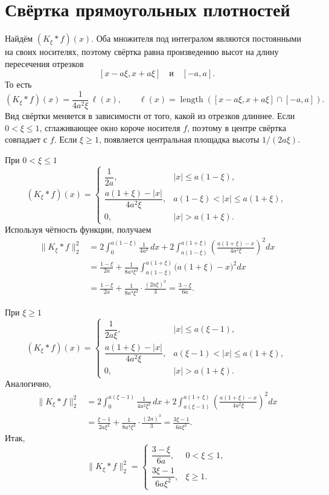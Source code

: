 \section*{Свёртка прямоугольных плотностей}

Найдём $(K_\xi*f)(x)$. Оба множителя под интегралом являются постоянными на
своих носителях, поэтому свёртка равна произведению высот на длину
пересечения отрезков
\[
[x-a\xi,x+a\xi]\quad\text{и}\quad[-a,a].
\]
То есть
\[
(K_\xi*f)(x)
=\frac{1}{4a^2\xi}\,\ell(x),
\qquad
\ell(x)=
\operatorname{length}\left([x-a\xi,x+a\xi]\cap[-a,a]\right).
\]
Вид свёртки меняется в зависимости от того, какой из отрезков длиннее.
Если $0<\xi\le 1$, сглаживающее окно короче носителя $f$, поэтому в центре
свёртка совпадает с $f$. Если $\xi\ge 1$, появляется центральная площадка
высоты $1/(2a\xi)$.

При $0<\xi\le 1$
\[
(K_\xi*f)(x)=
\begin{cases}
\dfrac{1}{2a}, & |x|\le a(1-\xi),\\[6pt]
\dfrac{a(1+\xi)-|x|}{4a^2\xi},
& a(1-\xi)<|x|\le a(1+\xi),\\[6pt]
0, & |x|>a(1+\xi).
\end{cases}
\]
Используя чётность функции, получаем
\[
\begin{aligned}
\|K_\xi*f\|_2^2
&=2\int_0^{a(1-\xi)}\frac{1}{4a^2}\,dx
+2\int_{a(1-\xi)}^{a(1+\xi)}
\left(\frac{a(1+\xi)-x}{4a^2\xi}\right)^2 dx\\
&=\frac{1-\xi}{2a}
+\frac{1}{8a^4\xi^2}
\int_{a(1-\xi)}^{a(1+\xi)}
\bigl(a(1+\xi)-x\bigr)^2 dx\\
&=\frac{1-\xi}{2a}
+\frac{1}{8a^4\xi^2}\cdot\frac{(2a\xi)^3}{3}
=\frac{3-\xi}{6a}.
\end{aligned}
\]

При $\xi\ge 1$
\[
(K_\xi*f)(x)=
\begin{cases}
\dfrac{1}{2a\xi}, & |x|\le a(\xi-1),\\[6pt]
\dfrac{a(1+\xi)-|x|}{4a^2\xi},
& a(\xi-1)<|x|\le a(1+\xi),\\[6pt]
0, & |x|>a(1+\xi).
\end{cases}
\]
Аналогично,
\[
\begin{aligned}
\|K_\xi*f\|_2^2
&=2\int_0^{a(\xi-1)}\frac{1}{4a^2\xi^2}\,dx
+2\int_{a(\xi-1)}^{a(1+\xi)}
\left(\frac{a(1+\xi)-x}{4a^2\xi}\right)^2 dx\\
&=\frac{\xi-1}{2a\xi^2}
+\frac{1}{8a^4\xi^2}\cdot\frac{(2a)^3}{3}
=\frac{3\xi-1}{6a\xi^2}.
\end{aligned}
\]
Итак,
\[
\|K_\xi*f\|_2^2=
\begin{cases}
\dfrac{3-\xi}{6a}, & 0<\xi\le 1,\\[6pt]
\dfrac{3\xi-1}{6a\xi^2}, & \xi\ge 1.
\end{cases}
\]

